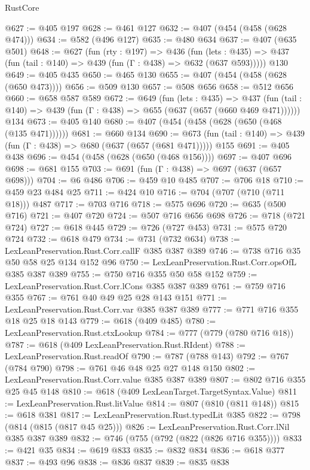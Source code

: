 \begin{lexlean}{RustCore}
\begin{coremodule}
@627 := @405 @197
@628 := @461 @127
@632 := @407 (@454 (@458 (@628 @474)))
@634 := @582 (@496 @127)
@635 := @480 @634
@637 := @407 (@635 @501)
@648 := @627
    (fun (rty : @197) =>
    @436
      (fun (lets : @435) => @437 (fun (tail : @140) => @439 (fun (Γ : @438) => @632 (@637 @593)))))
    @130
@649 := @405 @435
@650 := @465 @130
@655 := @407 (@454 (@458 (@628 (@650 @473))))
@656 := @509 @130
@657 := @508 @656
@658 := @512 @656
@660 := @658 @587 @589
@672 := @649
    (fun (lets : @435) =>
    @437 (fun (tail : @140) => @439 (fun (Γ : @438) => @655 (@637 (@657 (@660 @469 @471))))))
    @134
@673 := @405 @140
@680 := @407 (@454 (@458 (@628 (@650 (@468 (@135 @471))))))
@681 := @660 @134
@690 := @673 (fun (tail : @140) => @439 (fun (Γ : @438) => @680 (@637 (@657 (@681 @471))))) @155
@691 := @405 @438
@696 := @454 (@458 (@628 (@650 (@468 @156))))
@697 := @407 @696
@698 := @681 @155
@703 := @691 (fun (Γ : @438) => @697 (@637 (@657 @698)))
@704 := @6 @486
@706 := @459 @10 @485
@707 := @706 @18
@710 := @459 @23 @484 @25
@711 := @424 @10
@716 := @704 (@707 (@710 (@711 @18))) @487
@717 := @703 @716
@718 := @575 @696
@720 := @635 (@500 @716)
@721 := @407 @720
@724 := @507 @716 @656 @698
@726 := @718 (@721 @724)
@727 := @618 @445
@729 := @726 (@727 @453)
@731 := @575 @720 @724
@732 := @618 @479
@734 := @731 (@732 @634)
@738 := LexLeanPreservation.Rust.Corr.callF @385 @387 @389
@746 := @738 @716 @35 @50 @58 @25 @134 @152 @96
@750 := LexLeanPreservation.Rust.Corr.opsOfL @385 @387 @389
@755 := @750 @716 @355 @50 @58 @152
@759 := LexLeanPreservation.Rust.Corr.lCons @385 @387 @389
@761 := @759 @716 @355
@767 := @761 @40 @49 @25 @28 @143 @151
@771 := LexLeanPreservation.Rust.Corr.var @385 @387 @389
@777 := @771 @716 @355 @18 @25 @18 @143
@779 := @618 (@409 @485)
@780 := LexLeanPreservation.Rust.ctxLookup
@784 := @777 (@779 (@780 @716 @18))
@787 := @618 (@409 LexLeanPreservation.Rust.RIdent)
@788 := LexLeanPreservation.Rust.readOf
@790 := @787 (@788 @143)
@792 := @767 (@784 @790)
@798 := @761 @46 @48 @25 @27 @148 @150
@802 := LexLeanPreservation.Rust.Corr.value @385 @387 @389
@807 := @802 @716 @355 @25 @45 @148
@810 := @618 (@409 LexLeanTarget.TargetSyntax.Value)
@811 := LexLeanPreservation.Rust.litValue
@814 := @807 (@810 (@811 @148))
@815 := @618 @381
@817 := LexLeanPreservation.Rust.typedLit @385
@822 := @798 (@814 (@815 (@817 @45 @25)))
@826 := LexLeanPreservation.Rust.Corr.lNil @385 @387 @389
@832 := @746 (@755 (@792 (@822 (@826 @716 @355))))
@833 := @421 @35
@834 := @619 @833
@835 := @832 @834
@836 := @618 @377
@837 := @493 @96
@838 := @836 @837
@839 := @835 @838

\end{coremodule}
\end{lexlean}
